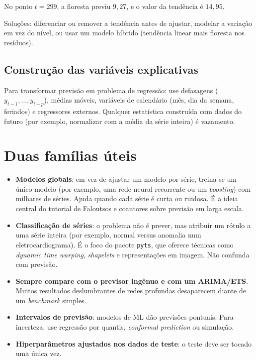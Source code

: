 \begin{simulacao}
No ponto $t=299$, a floresta previu $9{,}27$, e o valor da tendência é $14{,}95$.
\end{simulacao}

Soluções: diferenciar ou remover a tendência antes de ajustar, modelar a variação em vez do nível, ou usar um modelo híbrido (tendência linear mais floresta nos resíduos).

\subsection{Construção das variáveis explicativas}
Para transformar previsão em problema de regressão: use defasagens ($y_{t-1},\dots,y_{t-p}$), médias móveis, variáveis de calendário (mês, dia da semana, feriados) e regressores externos. Qualquer estatística construída com dados do futuro (por exemplo, normalizar com a média da série inteira) é vazamento.

\section{Duas famílias úteis}
\begin{itemize}[leftmargin=1.4em]
\item \textbf{Modelos globais}: em vez de ajustar um modelo por série, treina-se um único modelo (por exemplo, uma rede neural recorrente ou um \emph{boosting}) com milhares de séries. Ajuda quando cada série é curta ou ruidosa. É a ideia central do tutorial de Faloutsos e coautores sobre previsão em larga escala.
\item \textbf{Classificação de séries}: o problema não é prever, mas atribuir um rótulo a uma série inteira (por exemplo, normal versus anomalia num eletrocardiograma). É o foco do pacote \texttt{pyts}, que oferece técnicas como \emph{dynamic time warping}, \emph{shapelets} e representações em imagem. Não confunda com previsão.
\end{itemize}

\begin{atencao}[{Armadilhas}]
\begin{itemize}[leftmargin=1.2em]
\item \textbf{Sempre compare com o previsor ingênuo e com um ARIMA/ETS}. Muitos resultados deslumbrantes de redes profundas desaparecem diante de um \emph{benchmark} simples.
\item \textbf{Intervalos de previsão}: modelos de ML dão previsões pontuais. Para incerteza, use regressão por quantis, \emph{conformal prediction} ou simulação.
\item \textbf{Hiperparâmetros ajustados nos dados de teste}: o teste deve ser tocado uma única vez.
\end{itemize}
\end{atencao}

